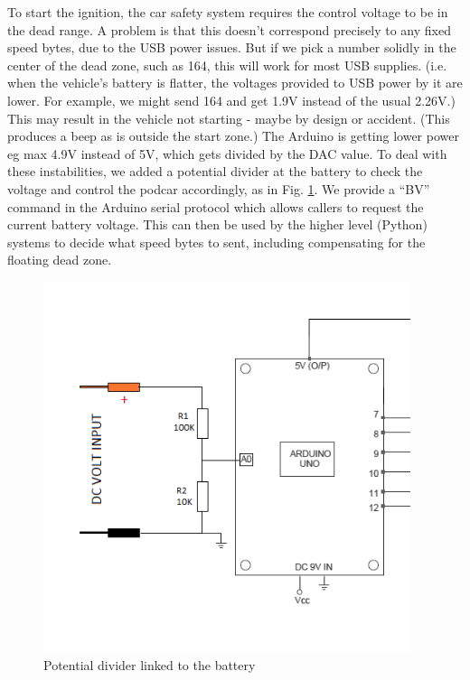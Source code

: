 \documentclass[a4paper]{article}
\begin{document}
To start the ignition, the car safety system requires the control voltage to be in the dead range.   A problem is that this doesn’t correspond precisely to any fixed speed bytes, due to the USB power issues.  But if we pick a number solidly in the center of the dead zone, such as 164, this will work for most USB supplies.   (i.e. when the vehicle’s battery is flatter, the voltages provided to USB power by it are lower. For example, we might send 164 and get 1.9V instead of the usual 2.26V.)   This may result in the vehicle not starting - maybe by design or accident. (This produces a beep as is outside the start zone.)  The Arduino is getting lower power eg max 4.9V instead of 5V, which gets divided by the DAC value.  To deal with these instabilities, we added a potential divider at the battery to check the voltage and control the podcar accordingly, as in Fig. \ref{fig:potential_divider}. We provide a “BV” command in the Arduino serial protocol which allows callers to request the current battery voltage. This can then be used by the higher level (Python) systems to decide what speed bytes to sent, including compensating for the floating dead zone.

\begin{figure}
	\includegraphics[width=\columnwidth]{hardware/potential_divider.png}
	\caption{Potential divider linked to the battery}
	\label{fig:potential_divider}
\end{figure}
\end{document}

